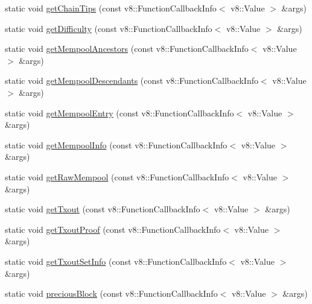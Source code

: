 \begin{DoxyCompactItemize}
\item 
static void \mbox{\hyperlink{class_rad_j_a_v_1_1_blockchain_v1_aab1c6b116597ba51d7c3a011c7ab3cb5}{get\+Chain\+Tips}} (const v8\+::\+Function\+Callback\+Info$<$ v8\+::\+Value $>$ \&args)
\item 
static void \mbox{\hyperlink{class_rad_j_a_v_1_1_blockchain_v1_a3c2272f2f8d1ffce80cb67961f89c71c}{get\+Difficulty}} (const v8\+::\+Function\+Callback\+Info$<$ v8\+::\+Value $>$ \&args)
\item 
static void \mbox{\hyperlink{class_rad_j_a_v_1_1_blockchain_v1_a28f21bf84a44c13cbbad8b711bcefa61}{get\+Mempool\+Ancestors}} (const v8\+::\+Function\+Callback\+Info$<$ v8\+::\+Value $>$ \&args)
\item 
static void \mbox{\hyperlink{class_rad_j_a_v_1_1_blockchain_v1_a5d537b883dfe8bf628b68a87c22be812}{get\+Mempool\+Descendants}} (const v8\+::\+Function\+Callback\+Info$<$ v8\+::\+Value $>$ \&args)
\item 
static void \mbox{\hyperlink{class_rad_j_a_v_1_1_blockchain_v1_a097634130b0a994627d89dff700da8aa}{get\+Mempool\+Entry}} (const v8\+::\+Function\+Callback\+Info$<$ v8\+::\+Value $>$ \&args)
\item 
static void \mbox{\hyperlink{class_rad_j_a_v_1_1_blockchain_v1_affb050420ac0f9f8c767945f4b1db2e7}{get\+Mempool\+Info}} (const v8\+::\+Function\+Callback\+Info$<$ v8\+::\+Value $>$ \&args)
\item 
static void \mbox{\hyperlink{class_rad_j_a_v_1_1_blockchain_v1_a4ebd0adb694761ac85ee9b8c466fe316}{get\+Raw\+Mempool}} (const v8\+::\+Function\+Callback\+Info$<$ v8\+::\+Value $>$ \&args)
\item 
static void \mbox{\hyperlink{class_rad_j_a_v_1_1_blockchain_v1_a8dd48f9fc173413d4f0836bf9b57c185}{get\+Txout}} (const v8\+::\+Function\+Callback\+Info$<$ v8\+::\+Value $>$ \&args)
\item 
static void \mbox{\hyperlink{class_rad_j_a_v_1_1_blockchain_v1_af2050f0d36a983ba908cbc69eaed1202}{get\+Txout\+Proof}} (const v8\+::\+Function\+Callback\+Info$<$ v8\+::\+Value $>$ \&args)
\item 
static void \mbox{\hyperlink{class_rad_j_a_v_1_1_blockchain_v1_a6469e96c35ecd9a003791ea4bab10f95}{get\+Txout\+Set\+Info}} (const v8\+::\+Function\+Callback\+Info$<$ v8\+::\+Value $>$ \&args)
\item 
static void \mbox{\hyperlink{class_rad_j_a_v_1_1_blockchain_v1_a750a337283e78bb90fddf26ab78a753c}{precious\+Block}} (const v8\+::\+Function\+Callback\+Info$<$ v8\+::\+Value $>$ \&args)
\item 

\end{DoxyCompactItemize}
